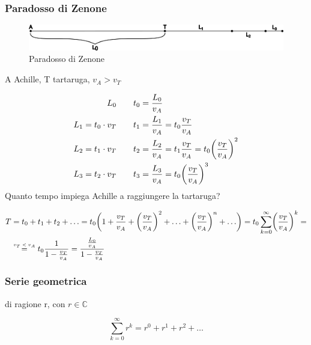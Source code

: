 \subsubsection{Paradosso di Zenone} 
\begin{figure}[!h]
	\centering
	\includegraphics[width=0.7\linewidth]{zenone}
	\caption{Paradosso di Zenone}
	\label{fig:zenone}
\end{figure}

A Achille, T tartaruga, $v_A>v_T$ 

\begin{align*}
\centering
L_0 & \qquad t_0 = \frac{L_0}{v_A} 
\\
L_1=t_0\cdot v_T & \qquad t_1=\frac{L_1}{v_A} = t_0\frac{v_T}{v_A}
\\
L_2=t_1\cdot v_T & \qquad t_2=\frac{L_2}{v_A} = t_1 \frac{v_T}{v_A} = t_0 \biggl( \frac{v_T}{v_A} \biggr) ^2 
\\
L_3=t_2\cdot v_T & \qquad t_3=\frac{L_3}{v_A} =  t_0 \biggl( \frac{v_T}{v_A} \biggr) ^3
\end{align*}
Quanto tempo impiega Achille a raggiungere la tartaruga?

\newcommand\zenone{\stackrel{\mbox{\tiny{$v_T<v_A$}}}{=}}

\begin{align*}
	T   &= t_0 + t_1 + t_2 + \ldots = t_0 \biggl(1 + \frac{v_T}{v_A} + \biggl(\frac{v_T}{v_A}\biggr)^2 + \ldots + \biggl(\frac{v_T}{v_A}\biggr)^n + \ldots \biggr)	= t_0 \sum_{k=0}^\infty \biggl(\frac{v_T}{v_A}\biggr)^k = \\
	&\zenone t_0 \frac{1}{1-\frac{v_T}{v_A}} = \frac{\frac{L_0}{v_A}}{1-\frac{v_T}{v_A}}
\end{align*}

\subsubsection{Serie geometrica} di ragione r, con $r\in\mathbb{C}$

\begin{equation*}
	\sum_{k=0}^\infty r^k = r^0 + r^1 + r^2 + \ldots
\end{equation*}

